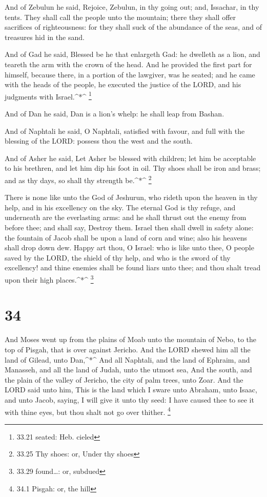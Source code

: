  And of Zebulun he said, Rejoice, Zebulun, in thy going
out; and, Issachar, in thy tents.  They shall call the
people unto the mountain; there they shall offer sacrifices of
righteousness: for they shall suck of the abundance of the seas, and of
treasures hid in the sand.

 And of Gad he said, Blessed be he that enlargeth Gad: he
dwelleth as a lion, and teareth the arm with the crown of the head.
 And he provided the first part for himself, because there,
in a portion of the lawgiver, was he seated; and he came with the heads
of the people, he executed the justice of the LORD, and his judgments
with Israel.\^{}*\^{} \footnote{33.21 seated: Heb. cieled}

 And of Dan he said, Dan is a lion's whelp: he shall leap
from Bashan.

 And of Naphtali he said, O Naphtali, satisfied with
favour, and full with the blessing of the LORD: possess thou the west
and the south.

 And of Asher he said, Let Asher be blessed with children;
let him be acceptable to his brethren, and let him dip his foot in oil.
 Thy shoes shall be iron and brass; and as thy days, so
shall thy strength be.\^{}*\^{} \footnote{33.25 Thy shoes: or, Under thy
  shoes}

 There is none like unto the God of Jeshurun, who rideth
upon the heaven in thy help, and in his excellency on the sky.
 The eternal God is thy refuge, and underneath are the
everlasting arms: and he shall thrust out the enemy from before thee;
and shall say, Destroy them.  Israel then shall dwell in
safety alone: the fountain of Jacob shall be upon a land of corn and
wine; also his heavens shall drop down dew.  Happy art
thou, O Israel: who is like unto thee, O people saved by the LORD, the
shield of thy help, and who is the sword of thy excellency! and thine
enemies shall be found liars unto thee; and thou shalt tread upon their
high places.\^{}*\^{} \footnote{33.29 found\ldots: or, subdued}

\hypertarget{section-33}{%
\section{34}\label{section-33}}

 And Moses went up from the plains of Moab unto the mountain
of Nebo, to the top of Pisgah, that is over against Jericho. And the
LORD shewed him all the land of Gilead, unto Dan,\^{}*\^{} 
And all Naphtali, and the land of Ephraim, and Manasseh, and all the
land of Judah, unto the utmost sea,  And the south, and the
plain of the valley of Jericho, the city of palm trees, unto Zoar.
 And the LORD said unto him, This is the land which I sware
unto Abraham, unto Isaac, and unto Jacob, saying, I will give it unto
thy seed: I have caused thee to see it with thine eyes, but thou shalt
not go over thither. \footnote{34.1 Pisgah: or, the hill}

